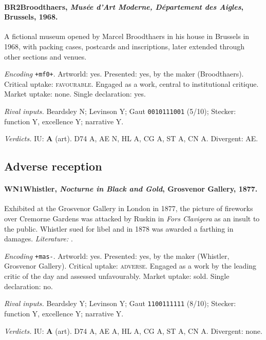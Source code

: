 \paragraph{BR2\enspace Broodthaers, \emph{Mus\'ee d'Art Moderne, D\'epartement des Aigles}, Brussels, 1968.}
A fictional museum opened by Marcel Broodthaers in his house in Brussels in 1968, with packing cases, postcards and inscriptions, later extended through other sections and venues.\par
\noindent\textit{Encoding} \texttt{+mf0+}. Artworld: yes. Presented: yes, by the maker (Broodthaers). Critical uptake: \textsc{favourable}. Engaged as a work, central to institutional critique. Market uptake: none. Single declaration: yes.\par
\noindent\textit{Rival inputs.} Beardsley N; Levinson Y; Gaut \texttt{0010111001} (5/10); Stecker: function Y, excellence Y; narrative Y.\par
\noindent\textit{Verdicts.} IU: \textbf{A} (art). D74 A, AE N, HL A, CG A, ST A, CN A. Divergent: AE.\par

\subsection{Adverse reception}

\paragraph{WN1\enspace Whistler, \emph{Nocturne in Black and Gold}, Grosvenor Gallery, 1877.}
Exhibited at the Grosvenor Gallery in London in 1877, the picture of fireworks over Cremorne Gardens was attacked by Ruskin in \emph{Fors Clavigera} as an insult to the public. Whistler sued for libel and in 1878 was awarded a farthing in damages. \textit{Literature:} \citet{Whistler1890}.\par
\noindent\textit{Encoding} \texttt{+mas-}. Artworld: yes. Presented: yes, by the maker (Whistler, Grosvenor Gallery). Critical uptake: \textsc{adverse}. Engaged as a work by the leading critic of the day and assessed unfavourably. Market uptake: sold. Single declaration: no.\par
\noindent\textit{Rival inputs.} Beardsley Y; Levinson Y; Gaut \texttt{1100111111} (8/10); Stecker: function Y, excellence Y; narrative Y.\par
\noindent\textit{Verdicts.} IU: \textbf{A} (art). D74 A, AE A, HL A, CG A, ST A, CN A. Divergent: none.\par

